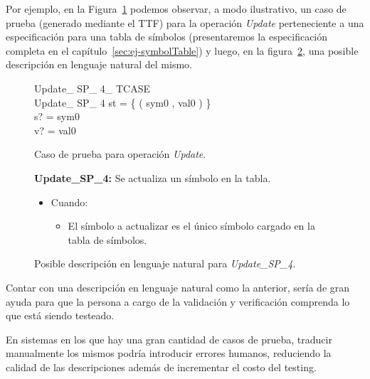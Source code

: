 Por ejemplo, en la Figura~\ref{fig:intro_tcl} podemos observar, a modo ilustrativo, un caso de prueba (generado mediante el TTF) para la operación \emph{Update} perteneciente a una especificación para una tabla de símbolos (presentaremos la especificación completa en el capítulo~\ref{sec:ej-symbolTable}) y luego, en la figura~\ref{fig:intro_tcl1}, una posible descripción en lenguaje natural del mismo.

\begin{figure}[H]
	\centering
  \begin{schema}{Update\_ SP\_ 4\_ TCASE}\\
   Update\_ SP\_ 4 
  \where
   st = \{ ( sym0 , val0 ) \} \\
   s? = sym0 \\
   v? = val0
 \end{schema}
 \caption{Caso de prueba para operación \emph{Update}.}
  \label{fig:intro_tcl}
\end{figure}
 
 \begin{figure}[H]
 \begin{framed}
 \textbf{Update\_SP\_4:} Se actualiza un símbolo en la tabla.  
  \begin{itemize}
   \item{Cuando:}
   \begin{itemize}
  	  \item{El símbolo a actualizar es el único símbolo cargado en la tabla de símbolos.}   
   \end{itemize}
  \end{itemize}
  \end{framed}
 \caption{Posible descripción en lenguaje natural para \emph{Update\_SP\_4}.}
 \label{fig:intro_tcl1}
\end{figure}

Contar con una descripción en lenguaje natural como la anterior, sería de gran ayuda para que la persona a cargo de la validación y verificación comprenda lo que está siendo testeado.


En sistemas en los que hay una gran cantidad de casos de prueba, traducir manualmente los mismos podría introducir errores humanos, reduciendo la calidad de las descripciones además de incrementar el costo del testing.

